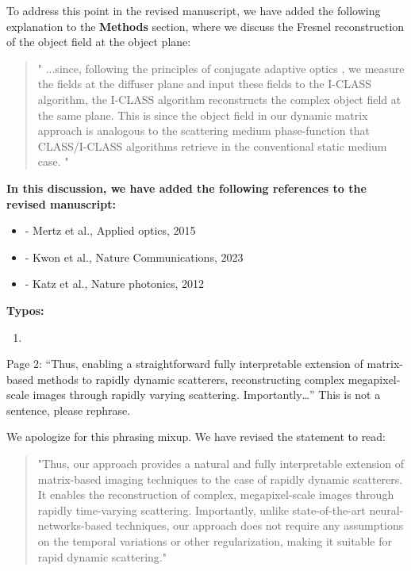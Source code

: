 \documentclass[12pt]{article}
\newenvironment{solved_reviewercomment}
    {\begin{tcolorbox}[width=\linewidth,colback=gray!5,colframe=solved_commentcolor!50,title=Reviewer Comment,left=5pt,right=5pt]}
    {\end{tcolorbox}}
\newenvironment{finished_ourresponse}
    {\begin{tcolorbox}[width=\linewidth,breakable,enhanced,colback=gray!5,colframe=finished_responsecolor!50,title=Response,left=5pt,right=5pt]}
    {\end{tcolorbox}}
\newenvironment{ourresponse}
    {\begin{tcolorbox}[width=\linewidth,breakable,enhanced,colback=gray!5,colframe=responsecolor!50,title=Response,left=5pt,right=5pt]}
    {\end{tcolorbox}}
\begin{document}
\begin{ourresponse}
    To address this point in the revised manuscript, we have added the following explanation to the\textbf{ Methods} section, where we discuss the Fresnel reconstruction of the object field at the object plane:

    \begin{quote}
        "
        ...since, following the principles of conjugate adaptive optics \cite{mertz2015field, kwon2023computational, sunray2024beyond, katz2012looking}, we measure the fields at the diffuser plane and input these fields to the I-CLASS algorithm, the I-CLASS algorithm reconstructs the complex object field at the same plane. This is since the object field in our dynamic matrix approach is analogous to the scattering medium phase-function that CLASS/I-CLASS algorithms retrieve in the conventional static medium case.
        "
    \end{quote}
    \textbf{In this discussion, we have added the following references to the revised manuscript:}
    \begin{itemize}[nosep]
    \item \cite{mertz2015field} - Mertz et al., Applied optics, 2015
    \item \cite{kwon2023computational} - Kwon et al., Nature Communications, 2023
    \item \cite{katz2012looking} - Katz et al., Nature photonics, 2012
    \end{itemize}
\end{ourresponse}


\textbf{Typos:}

\begin{enumerate}[label=\arabic*., resume]
\item \leavevmode
\end{enumerate}
\vspace{-1em}
\begin{solved_reviewercomment}
    Page 2: “Thus, enabling a straightforward fully interpretable extension of matrix-based methods to rapidly dynamic scatterers, reconstructing complex megapixel-scale images through rapidly varying scattering. Importantly…” This is not a sentence, please rephrase.
\end{solved_reviewercomment}

\begin{finished_ourresponse}
    We apologize for this phrasing mixup. We have revised the statement to read:
    
    \begin{quote}
        "Thus, our approach provides a natural and fully interpretable extension of matrix-based imaging techniques to the case of rapidly dynamic scatterers. 
        It enables the reconstruction of complex, megapixel-scale images through rapidly time-varying scattering. Importantly, unlike state-of-the-art neural-networks-based techniques, our approach does not require any assumptions on the temporal variations or other regularization, making it suitable for rapid dynamic scattering."
    \end{quote}
    
\end{finished_ourresponse}
\end{document}
